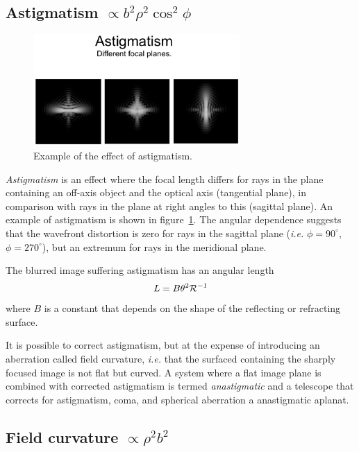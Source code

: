 \subsection{Astigmatism $\propto b^2\rho^2\cos^2\phi$}

\begin{figure}[th!]
	\centering
	\includegraphics[width=0.7\textwidth]{astigmatism-example.eps}
  \caption{Example of the effect of astigmatism.}
  \label{fig:astigmatism-example}
\end{figure}

{\it Astigmatism} is an effect where the focal length differs for rays in the plane
containing an off-axis object and the optical axis (tangential plane),
in comparison with rays in the plane at right angles to this (sagittal plane).
An example of astigmatism is shown in figure~\ref{fig:astigmatism-example}.
The angular dependence suggests that the wavefront distortion is zero for rays
in the sagittal plane ({\it i.e.} $\phi=90^{\circ}$, $\phi=270^{\circ}$), but an extremum for
rays in the meridional plane.

The blurred image suffering astigmatism has an angular length
\[
L=B\theta^2{\cal R}^{-1}
\]
where $B$ is a constant that depends on the shape of the reflecting or refracting surface.

It is possible to correct astigmatism, but at the expense of introducing
an aberration called field curvature, {\it i.e.} that the surfaced containing
the sharply focused image is not flat but curved. A system where a flat 
image plane is combined with corrected astigmatism is termed {\it anastigmatic}
and a telescope that corrects for astigmatism, coma, and spherical aberration a
anastigmatic aplanat. 

\subsection{Field curvature $\propto\rho^2 b^2$}

